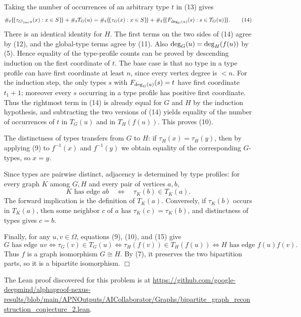 Taking the number of occurrences of an arbitrary type $t$ in (13) gives
\[
\#_t\{\!\{\tau_{G \setminus_{\mathrm{inc}} u}(x):x\in S\}\!\}
+
\#_t T_G(u)
=
\#_t\{\!\{\tau_G(x):x\in S\}\!\}
+
\#_t\{\!\{F_{\deg_{G}(u)}(s):s\in T_G(u)\}\!\}.                        \tag{14}
\]
There is an identical identity for $H$. The first terms on the two sides of
(14) agree by (12), and the global-type terms agree by (11). Also
$\deg_{G}(u)=\deg_{H}(f(u))$ by (5). Hence equality of the type-profile counts
can be proved by descending induction on the first coordinate of $t$. The base
case is that no type in a type profile can have first coordinate at least $n$,
since every vertex degree is $<n$. For the induction step, the only types
$s$ with $F_{\deg_{G}(u)}(s)=t$ have first coordinate $t_1+1$; moreover every
$s$ occurring in a type profile has positive first coordinate. Thus the
rightmost term in (14) is already equal for $G$ and $H$ by the induction
hypothesis, and subtracting the two versions of (14) yields equality of the
number of occurrences of $t$ in $T_G(u)$ and in $T_H(f(u))$. This proves (10).

The distinctness of types transfers from $G$ to $H$: if
$\tau_H(x)=\tau_H(y)$, then by applying (9) to $f^{-1}(x)$ and $f^{-1}(y)$ we
obtain equality of the corresponding $G$-types, so $x=y$.

Since types are pairwise distinct, adjacency is determined by type profiles:
for every graph $K$ among $G,H$ and every pair of vertices $a,b$,
\[
K\text{ has edge }ab
\quad\Longleftrightarrow\quad
\tau_K(b)\in T_K(a).                                                \tag{15}
\]
The forward implication is the definition of $T_K(a)$. Conversely, if
$\tau_K(b)$ occurs in $T_K(a)$, then some neighbor $c$ of $a$ has
$\tau_K(c)=\tau_K(b)$, and distinctness of types gives $c=b$.

Finally, for any $u,v\in\Omega$, equations (9), (10), and (15) give
\[
G\text{ has edge }uv
\Longleftrightarrow
\tau_G(v)\in T_G(u)
\Longleftrightarrow
\tau_H(f(v))\in T_H(f(u))
\Longleftrightarrow
H\text{ has edge }f(u)f(v).
\]
Thus $f$ is a graph isomorphism $G\cong H$. By (7), it preserves the two
bipartition parts, so it is a bipartite isomorphism. \hfill $\Box$

The Lean proof discovered for this problem is at \url{https://github.com/google-deepmind/alphaproof-nexus-results/blob/main/APNOutputs/AICollaborator/Graphs/bipartite_graph_reconstruction_conjecture_2.lean}.